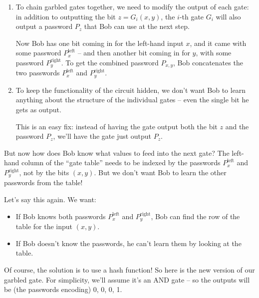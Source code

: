 \begin{enumerate}
\item
  To chain garbled gates together, we need to modify the output of each
  gate: in addition to outputting the bit $z = G_{i}(x,y)$, the
  $i$-th gate $G_{i}$ will also output a password $P_{z}$ that Bob
  can use at the next step.

  Now Bob has one bit coming in for the left-hand input $x$, and it
  came with some password $P_{x}^{\text{left}}$ -- and then another
  bit coming in for $y$, with some password $P_{y}^{\text{right}}$.
  To get the combined password $P_{x,y}$, Bob concatenates the two
  passwords $P_{x}^{\text{left}}$ and $P_{y}^{\text{right}}$.
\item
  To keep the functionality of the circuit hidden, we don't want Bob to
  learn anything about the structure of the individual gates -- even the
  single bit he gets as output.

  This is an easy fix: instead of having the gate output both the bit
  $z$ and the password $P_{z}$, we'll have the gate just output
  $P_{z}$.

  \end{enumerate}

  But now how does Bob know what values to feed into the next gate? The
  left-hand column of the ``gate table'' needs to be indexed by the
  passwords $P_{x}^{\text{left}}$ and $P_{y}^{\text{right}}$, not by
  the bits $(x,y)$. But we don't want Bob to learn the other
  passwords from the table!

  Let's say this again. We want:

  \begin{itemize}
  \item
    If Bob knows both passwords $P_{x}^{\text{left}}$ and
    $P_{y}^{\text{right}}$, Bob can find the row of the table for the
    input $(x,y)$.
  \item
    If Bob doesn't know the passwords, he can't learn them by looking
    at the table.
  \end{itemize}

  Of course, the solution is to use a hash function! So here is the new
  version of our garbled gate. For simplicity, we'll assume it's an
  AND gate -- so the outputs will be (the passwords encoding) 0, 0, 0,
  1.


